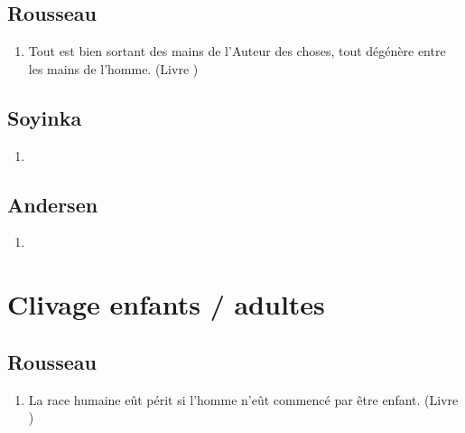 \documentclass[a4paper, 11pt, hidelinks]{article}
\newcommand{\rb}[1]{\Romanbar{#1}}
\begin{document}
\subsection{Rousseau}


\begin{enumerate}
    \item Tout est bien sortant des mains de l'Auteur des choses, tout dégénère entre les mains de l'homme. (Livre \rb{1})

\end{enumerate}



\subsection{Soyinka}


\begin{enumerate}
    \item 
\end{enumerate}




\subsection{Andersen}


\begin{enumerate}
    \item 
\end{enumerate}


























\section{Clivage enfants / adultes}



\subsection{Rousseau}


\begin{enumerate}
    \item La race humaine eût périt si l'homme n'eût commencé par être enfant. (Livre \rb{1})

\end{enumerate}
\end{document}
